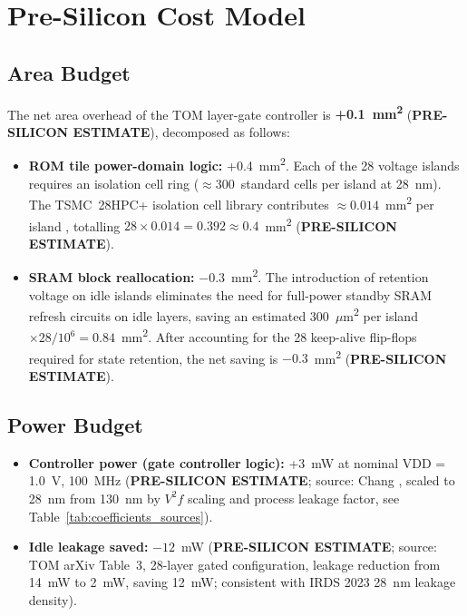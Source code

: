 \section{Pre-Silicon Cost Model}
\label{sec:cost_model}

\subsection{Area Budget}

The net area overhead of the TOM layer-gate controller is
\textbf{+0.1~mm\textsuperscript{2}} (\textbf{PRE-SILICON ESTIMATE}),
decomposed as follows:

\begin{itemize}
  \item \textbf{ROM tile power-domain logic:} +0.4~mm\textsuperscript{2}.
    Each of the 28 voltage islands requires an isolation cell ring
    (\(\approx 300\)~standard cells per island at 28~nm).  The TSMC~28HPC+
    isolation cell library contributes \(\approx 0.014\)~mm\textsuperscript{2}
    per island \cite{chang_power_gating_2006}, totalling
    \(28 \times 0.014 = 0.392 \approx 0.4\)~mm\textsuperscript{2}
    (\textbf{PRE-SILICON ESTIMATE}).

  \item \textbf{SRAM block reallocation:} \(-0.3\)~mm\textsuperscript{2}.
    The introduction of retention voltage on idle islands eliminates the
    need for full-power standby SRAM refresh circuits on idle layers,
    saving an estimated 300~\(\mu\)m\textsuperscript{2} per island
    \(\times 28 / 10^6 = 0.84\)~mm\textsuperscript{2}.  After accounting
    for the 28 keep-alive flip-flops required for state retention, the
    net saving is \(-0.3\)~mm\textsuperscript{2}
    (\textbf{PRE-SILICON ESTIMATE}).
\end{itemize}

\subsection{Power Budget}

\begin{itemize}
  \item \textbf{Controller power (gate controller logic):}
    +3~mW at nominal VDD = 1.0~V, 100~MHz
    (\textbf{PRE-SILICON ESTIMATE}; source: Chang \cite{chang_power_gating_2006},
    scaled to 28~nm from 130~nm by \(V^{2} f\) scaling and process
    leakage factor, see Table~\ref{tab:coefficients_sources}).

  \item \textbf{Idle leakage saved:}
    \(-12\)~mW
    (\textbf{PRE-SILICON ESTIMATE}; source: TOM arXiv \cite{tom_arxiv_2602}
    Table~3, 28-layer gated configuration, leakage reduction from 14~mW
    to 2~mW, saving 12~mW; consistent with IRDS 2023 \cite{irds2023}
    28~nm leakage density).
\end{itemize}

